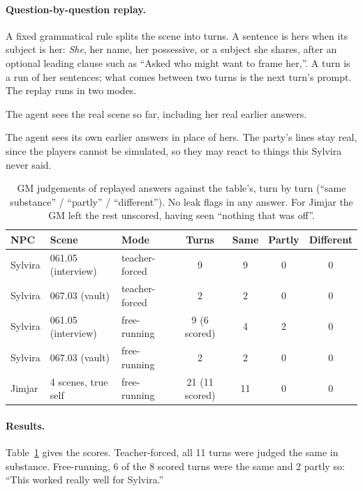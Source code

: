 \documentclass[11pt]{article}
\begin{document}
\paragraph{Question-by-question replay.}
A fixed grammatical rule splits the scene into turns. A sentence is hers when its
subject is her: \emph{She}, her name, her possessive, or a subject she shares, after an
optional leading clause such as ``Asked who might want to frame her,''. A turn is a
run of her sentences; what comes between two turns is the next turn's prompt. The
replay runs in two modes.
\begin{description}[nosep]
\item[Teacher-forced.] The agent sees the real scene so far, including her real
earlier answers.
\item[Free-running.] The agent sees its own earlier answers in place of hers. The
party's lines stay real, since the players cannot be simulated, so they may react to
things this Sylvira never said.
\end{description}

\begin{table}[t]
\centering
\small
\begin{tabular}{@{}lllcccc@{}}
\toprule
NPC & Scene & Mode & Turns & Same & Partly & Different \\
\midrule
Sylvira & 061.05 (interview) & teacher-forced & 9 & 9 & 0 & 0 \\
Sylvira & 067.03 (vault)     & teacher-forced & 2 & 2 & 0 & 0 \\
Sylvira & 061.05 (interview) & free-running   & 9 (6 scored) & 4 & 2 & 0 \\
Sylvira & 067.03 (vault)     & free-running   & 2 & 2 & 0 & 0 \\
Jimjar  & 4 scenes, true self & free-running  & 21 (11 scored) & 11 & 0 & 0 \\
\bottomrule
\end{tabular}
\caption{GM judgements of replayed answers against the table's, turn by turn
(``same substance'' / ``partly'' / ``different''). No leak flags in any answer. For
Jimjar the GM left the rest unscored, having seen ``nothing that was off''.}
\label{tab:replay}
\end{table}

\paragraph{Results.}
Table~\ref{tab:replay} gives the scores. Teacher-forced, all 11 turns were judged the
same in substance. Free-running, 6 of the 8 scored turns were the same and 2 partly
so: ``This worked really well for Sylvira.''
\end{document}
